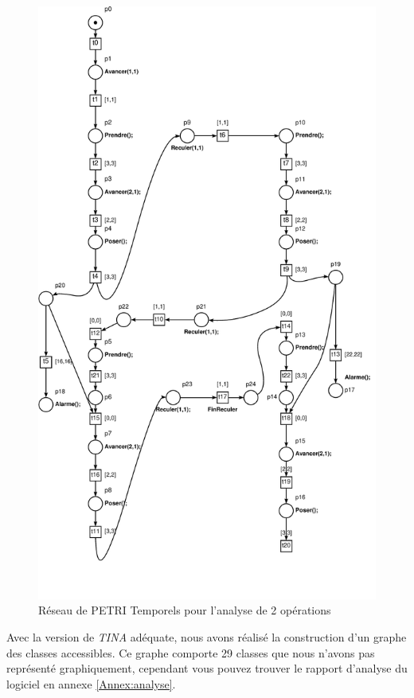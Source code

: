 \begin{figure}[!ht]
\centering
\includegraphics[height = .78\textheight]{./II/images/reseau-AnalyseIII-2.pdf}
\caption{Réseau de PETRI Temporels pour l'analyse de 2 opérations}\label{fig:RdpAnalyseIII-2}
\end{figure}

Avec la version de \emph{TINA} adéquate, nous avons réalisé la construction d'un graphe des classes accessibles. Ce graphe comporte 29 classes que nous n'avons pas représenté graphiquement, cependant vous pouvez trouver le rapport d'analyse du logiciel en annexe \ref{Annex:analyse}. 

